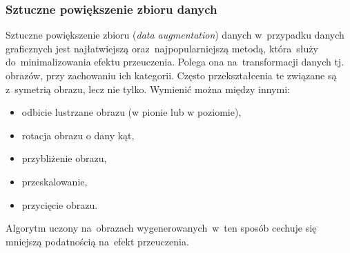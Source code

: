\subsubsection{Sztuczne powiększenie zbioru danych}
Sztuczne powiększenie zbioru (\textit{data augmentation}) danych w~przypadku danych graficznych jest najłatwiejszą oraz~najpopularniejszą metodą, która~służy do~minimalizowania efektu przeuczenia\cite{dataaugment}. Polega ona na~transformacji danych tj. obrazów, przy zachowaniu ich kategorii. Często przekształcenia te związane są z~symetrią obrazu, lecz nie tylko. Wymienić można między innymi:
\begin{itemize}
\item odbicie lustrzane obrazu (w pionie lub w poziomie),
\item rotacja obrazu o dany kąt,
\item przybliżenie obrazu,
\item przeskalowanie,
\item przycięcie obrazu.
\end{itemize}
Algorytm uczony na~obrazach wygenerowanych~w~ten sposób  cechuje się mniejszą podatnością na~efekt przeuczenia. 
